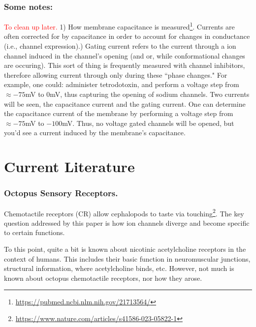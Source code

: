\subsubsection{Some notes:}
\textcolor{red}{To clean up later.}
1) How membrane capacitance is measured\footnote{\url{https://pubmed.ncbi.nlm.nih.gov/21713564/}}. Currents are often corrected for by capacitance in order to account for changes in conductance (i.e., channel expression).) Gating current refers to the current through a ion channel induced in the channel's opening (and or, while conformational changes are occuring). This sort of thing is frequently measured with channel inhibitors, therefore allowing current through only during these ``phase changes." For example, one could: administer tetrodotoxin, and perform a voltage step from $\approx -75$mV to 0mV, thus capturing the opening of sodium channels. Two currents will be seen, the capacitance current and the gating current. One can determine the capacitance current of the membrane by performing a voltage step from $\approx -75$mV to $-100$mV. Thus, no voltage gated channels will be opened, but you'd see a current induced by the membrane's capacitance.



\section{Current Literature}

\subsubsection{Octopus Sensory Receptors.}
Chemotactile receptors (CR) allow cephalopods to taste via touching\footnote{\url{https://www.nature.com/articles/s41586-023-05822-1}}. The key question addressed by this paper is how ion channels diverge and become specific to certain functions.\newline

To this point, quite a bit is known about nicotinic acetylcholine receptors in the context of humans. This includes their basic function in neuromuscular junctions, structural information, where acetylcholine binds, etc. However, not much is known about octopus chemotactile receptors, nor how they arose.\newline


